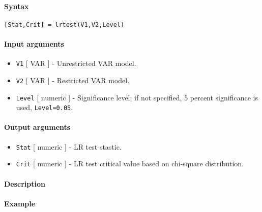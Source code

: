


	\paragraph{Syntax}

\begin{verbatim}
[Stat,Crit] = lrtest(V1,V2,Level)
\end{verbatim}

\paragraph{Input arguments}

\begin{itemize}
\item
  \texttt{V1} {[} VAR {]} - Unrestricted VAR model.
\item
  \texttt{V2} {[} VAR {]} - Restricted VAR model.
\item
  \texttt{Level} {[} numeric {]} - Significance level; if not specified,
  5 percent significance is used, \texttt{Level=0.05}.
\end{itemize}

\paragraph{Output arguments}

\begin{itemize}
\item
  \texttt{Stat} {[} numeric {]} - LR test stastic.
\item
  \texttt{Crit} {[} numeric {]} - LR test critical value based on
  chi-square distribution.
\end{itemize}

\paragraph{Description}

\paragraph{Example}


